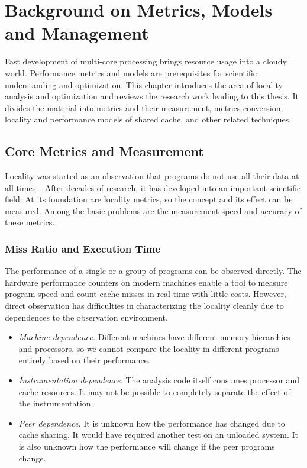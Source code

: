 \chapter{Background on Metrics, Models and Management}
\label{chap:background}

Fast development of multi-core processing brings resource usage into a
cloudy world.  Performance metrics and models are prerequisites for
scientific understanding and optimization.  This chapter introduces
the area of locality analysis and optimization and reviews the
research work leading to this thesis.  It divides the material into
metrics and their measurement, metrics conversion, locality and
performance models of shared cache, and other related techniques.


\section{Core Metrics and Measurement}
\label{sec:bg-locality}

Locality was started as an observation that programs do not use all
their data at all times~\citep{Denning:TSE80}.  After decades of
research, it has developed into an important scientific field.  At its
foundation are locality metrics, so the concept and its effect can be
measured.  Among the basic problems are the measurement speed and
accuracy of these metrics.

\subsection{Miss Ratio and Execution Time} 
The performance of a single or a group of programs can be
observed directly.  The hardware performance counters on modern
machines enable a tool to measure program speed and count cache misses
in real-time with little costs.  However, direct observation
has difficulties in characterizing the locality cleanly due to 
dependences to the observation environment.

\begin{itemize}
\item \emph{Machine dependence.}  Different machines have different
  memory hierarchies and processors, so we cannot compare the locality
  in different programs entirely based on their performance.
\item \emph{Instrumentation dependence.}  The analysis code itself consumes
  processor and cache resources.  It may not be
  possible to completely separate the effect of the instrumentation.
\item \emph{Peer dependence.}  It is unknown how the performance
  has changed due to cache sharing.  It would have required another
  test on an unloaded system.  It is also unknown how the
  performance will change if the peer programs change.
\end{itemize}

